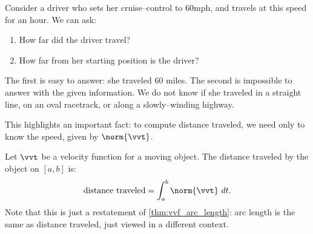 Consider a driver who sets her cruise--control to 60mph, and travels at this speed for an hour. We can ask:
\begin{enumerate}
	\item How far did the driver travel?
	\item	How far from her starting position is the driver?
\end{enumerate} 
The first is easy to answer: she traveled 60 miles. The second is impossible to answer with the given information. We do not know if she traveled in a straight line, on an oval racetrack, or along a slowly--winding highway.

This highlights an important fact: to compute distance traveled, we need only to know the speed, given by $\norm{\vvt}$.

{Let $\vvt$ be a velocity function for a moving object. The distance traveled by the object on $[a,b]$ is:
$$\text{distance traveled} = \int_a^b \norm{\vvt}\ dt.$$}
Note that this is just a restatement of \autoref{thm:vvf_arc_length}: arc length is the same as distance traveled, just viewed in a different context.


